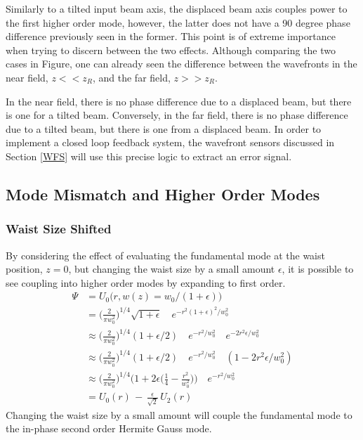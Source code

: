 		Similarly to a tilted input beam axis, the displaced beam axis couples power to the first higher order mode, however, the latter does not have a 90 degree phase difference previously seen in the former.  This point is of extreme importance when trying to discern between the two effects.  Although comparing the two cases in Figure, one can already seen the difference between the wavefronts in the near field, $z<<z_R$, and the far field, $z>>z_R$.  
		
		In the near field, there is no phase difference due to a displaced beam, but there is one for a tilted beam.  Conversely, in the far field, there is no phase difference due to a tilted beam, but there is one from a displaced beam.  In order to implement a closed loop feedback system, the wavefront sensors discussed in Section \ref{WFS} will use this precise logic to extract an error signal.
		
		\subsection{Mode Mismatch and Higher Order Modes}\label{Modemismatch}
		
		\subsubsection{Waist Size Shifted}
		By considering the effect of evaluating the fundamental mode at the waist position, $z=0$, but changing the waist size by a small amount $\epsilon$, it is possible to see coupling into higher order modes by expanding to first order.	
		\begin{equation}
		\begin{aligned}
		\Psi 	&=  		U_{0} \big(r,w(z) = w_0/(1+\epsilon) \big) 
		\\		&= 			\bigg( \frac{2}{\pi w_0^2} \bigg)^{1/4} \sqrt{1 + \epsilon} \quad e^{-r^2 (1+\epsilon)^2/w_0^2 }
		\\		&\approx 	\bigg( \frac{2}{\pi w_0^2} \bigg)^{1/4} (1 + \epsilon /2) \quad e^{-r^2/w_0^2} \quad e^{-2r^2\epsilon/w_0^2} 
		\\		&\approx 	\bigg( \frac{2}{\pi w_0^2} \bigg)^{1/4} (1 + \epsilon /2) \quad e^{-r^2/w_0^2} \quad (1-2r^2\epsilon/w_0^2)
		\\		&\approx 	\bigg( \frac{2}{\pi w_0^2} \bigg)^{1/4} \bigg(1+ 2\epsilon\bigg(\frac{1}{4} - \frac{r^2}{w_0^2}\bigg) \bigg ) \quad e^{-r^2/w_0^2}	
		\\		&=			U_0(r) \, - \, \frac{\epsilon}{\sqrt{2}} \, U_2(r)
		\end{aligned}
		\end{equation}
		Changing the waist size by a small amount will couple the fundamental mode to the in-phase second order Hermite Gauss mode.
		
